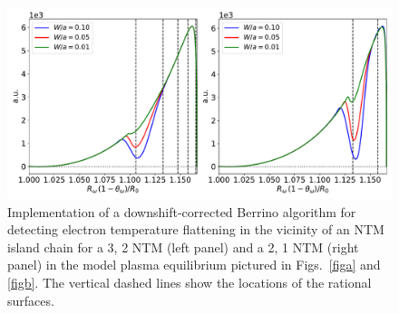 \documentclass[12pt,prb,aps]{revtex4-1}
\begin{document}
\begin{figure}
\centerline{\includegraphics[width=\textwidth]{Fig18.pdf}}
\caption{Implementation of a downshift-corrected  Berrino algorithm for detecting electron temperature flattening  in the vicinity of an NTM island chain  for a 3, 2  NTM (left panel) and a 2, 1 NTM (right panel) in the model plasma equilibrium pictured in Figs.~\ref{figa} and \ref{figb}. The vertical dashed lines show the locations of the rational surfaces. \label{fig16}}
\end{figure}
\fi
\end{document}
